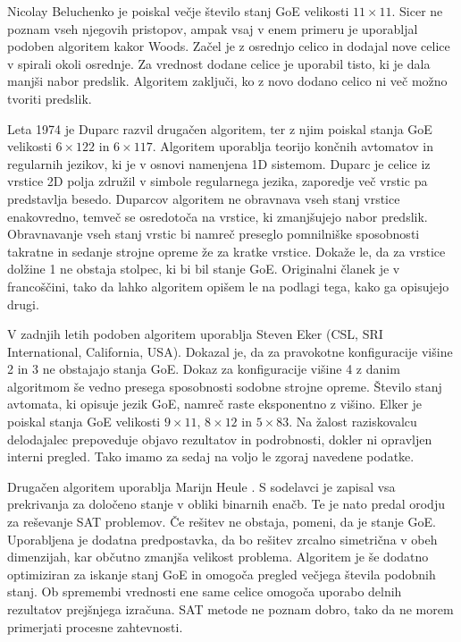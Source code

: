 \documentclass[12pt,a4paper,openany,twoside]{book}
\begin{document}
Nicolay Beluchenko je poiskal večje število stanj GoE velikosti \(11 \times 11\).
Sicer ne poznam vseh njegovih pristopov, ampak vsaj v enem primeru je uporabljal
podoben algoritem kakor Woods. Začel je z osrednjo celico in dodajal nove celice
v spirali okoli osrednje. Za vrednost dodane celice je uporabil tisto, ki je dala manjši nabor predslik.
Algoritem zaključi, ko z novo dodano celico ni več možno tvoriti predslik.

Leta 1974 je Duparc \cite{Duparc1972, Duparc1974} razvil drugačen algoritem,
ter z njim poiskal stanja GoE velikosti \(6 \times 122\) in \(6 \times 117\).
Algoritem uporablja teorijo končnih avtomatov in regularnih jezikov, ki je v
osnovi namenjena 1D sistemom.
Duparc je celice iz vrstice 2D polja združil v simbole regularnega jezika,
zaporedje več vrstic pa predstavlja besedo.
Duparcov algoritem ne obravnava vseh stanj vrstice enakovredno,
temveč se osredotoča na vrstice, ki zmanjšujejo nabor predslik.
Obravnavanje vseh stanj vrstic bi namreč preseglo pomnilniške sposobnosti
takratne in sedanje strojne opreme že za kratke vrstice.
Dokaže le, da za vrstice dolžine 1 ne obstaja stolpec, ki bi bil stanje GoE.
Originalni članek je v francoščini, tako da lahko algoritem opišem le na podlagi tega, kako ga opisujejo drugi.

V zadnjih letih podoben algoritem uporablja Steven Eker (CSL, SRI International, California, USA).
Dokazal je, da za pravokotne konfiguracije višine 2 in 3 ne obstajajo stanja GoE.
Dokaz za konfiguracije višine 4 z danim algoritmom še vedno presega sposobnosti sodobne strojne opreme.
Število stanj avtomata, ki opisuje jezik GoE, namreč raste eksponentno z višino.
Elker je poiskal stanja GoE velikosti \(9 \times 11\), \(8 \times 12\) in \(5 \times 83\).
Na žalost raziskovalcu delodajalec prepoveduje objavo rezultatov in podrobnosti, dokler ni opravljen interni pregled.
Tako imamo za sedaj na voljo le zgoraj navedene podatke.

Drugačen algoritem uporablja Marijn Heule \cite{Hartman2013}.
S sodelavci je zapisal vsa prekrivanja za določeno stanje v obliki binarnih enačb.
Te je nato predal orodju za reševanje SAT problemov.
Če rešitev ne obstaja, pomeni, da je stanje GoE.
Uporabljena je dodatna predpostavka, da bo rešitev zrcalno simetrična v obeh dimenzijah,
kar občutno zmanjša velikost problema.
Algoritem je še dodatno optimiziran za iskanje stanj GoE in
omogoča pregled večjega števila podobnih stanj.
Ob spremembi vrednosti ene same celice omogoča uporabo delnih rezultatov prejšnjega izračuna.
SAT metode ne poznam dobro, tako da ne morem primerjati procesne zahtevnosti.
\end{document}

